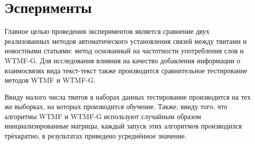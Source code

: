 \section{Эсперименты}
    Главное целью проведения экспериментов является сравнение двух реализованных методов автоматического установления связей между твитами и новостными статьями:
    метод основанный на частотности употребления слов и WTMF-G.
    Для исследования влияния на качество добавления информации о взаимосвязях вида текст-текст также производится сравнительное тестирование методов WTMF и WTMF-G.

    Ввиду малого числа твитов в наборах данных тестирование производится на тех же выборках, на которых производится обучение.
    Также, ввиду того, что алгоритмы WTMF и WTMF-G используют случайным образом инициализированные матрицы, каждый запуск этих алгоритмов производился трёхкратно,
    в результатах приведено усреднённое значение.

    
    
    
    


